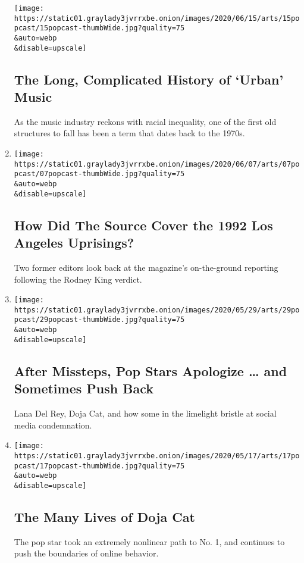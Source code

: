 \begin{enumerate}
  \texttt{[image: https://static01.graylady3jvrrxbe.onion/images/2020/06/15/arts/15popcast/15popcast-thumbWide.jpg?quality=75\\\&auto=webp\\\&disable=upscale]}

  \hypertarget{the-long-complicated-history-of-urban-music}{%
  \subsection{The Long, Complicated History of `Urban'
  Music}\label{the-long-complicated-history-of-urban-music}}

  As the music industry reckons with racial inequality, one of the first
  old structures to fall has been a term that dates back to the 1970s.
\item
  \href{/2020/06/07/arts/music/popcast-the-source-rodney-king.html}{}

  \texttt{[image: https://static01.graylady3jvrrxbe.onion/images/2020/06/07/arts/07popcast/07popcast-thumbWide.jpg?quality=75\\\&auto=webp\\\&disable=upscale]}

  \hypertarget{how-did-the-source-cover-the-1992-los-angeles-uprisings}{%
  \subsection{How Did The Source Cover the 1992 Los Angeles
  Uprisings?}\label{how-did-the-source-cover-the-1992-los-angeles-uprisings}}

  Two former editors look back at the magazine's on-the-ground reporting
  following the Rodney King verdict.
\item
  \href{/2020/06/01/arts/music/popcast-lana-del-rey-doja-cat-apologies.html}{}

  \texttt{[image: https://static01.graylady3jvrrxbe.onion/images/2020/05/29/arts/29popcast/29popcast-thumbWide.jpg?quality=75\\\&auto=webp\\\&disable=upscale]}

  \hypertarget{after-missteps-pop-stars-apologize--and-sometimes-push-back}{%
  \subsection{After Missteps, Pop Stars Apologize \ldots{} and Sometimes
  Push
  Back}\label{after-missteps-pop-stars-apologize--and-sometimes-push-back}}

  Lana Del Rey, Doja Cat, and how some in the limelight bristle at
  social media condemnation.
\item
  \href{/2020/05/18/arts/music/popcast-doja-cat.html}{}

  \texttt{[image: https://static01.graylady3jvrrxbe.onion/images/2020/05/17/arts/17popcast/17popcast-thumbWide.jpg?quality=75\\\&auto=webp\\\&disable=upscale]}

  \hypertarget{the-many-lives-of-doja-cat}{%
  \subsection{The Many Lives of Doja
  Cat}\label{the-many-lives-of-doja-cat}}

  The pop star took an extremely nonlinear path to No. 1, and continues
  to push the boundaries of online behavior.
\end{enumerate}

